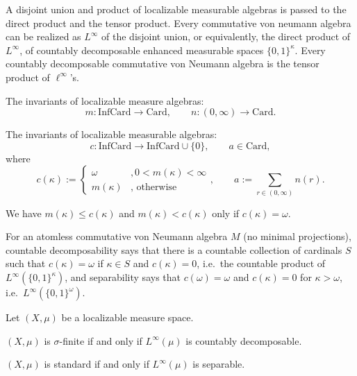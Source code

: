 \documentclass{../../large}
\begin{document}
A disjoint union and product of localizable measurable algebras is passed to the direct product and the tensor product.
Every commutative von neumann algebra can be realized as $L^\infty$ of the disjoint union, or equivalently, the direct product of $L^\infty$, of countably decomposable enhanced measurable spaces $\{0,1\}^\kappa$.
Every countably decomposable commutative von Neumann algebra is the tensor product of $\ell^\infty$'s.

The invariants of localizable measure algebras:
\[m:\mathrm{InfCard}\to\mathrm{Card},\qquad n:(0,\infty)\to\mathrm{Card}.\]

The invariants of localizable measurable algebras:
\[c:\mathrm{InfCard}\to\mathrm{InfCard}\cup\{0\},\qquad a\in\mathrm{Card},\]
where
\[c(\kappa):=\begin{cases}\omega&,0<m(\kappa)<\infty\\m(\kappa)&,\text{ otherwise}\end{cases},\qquad a:=\sum_{r\in(0,\infty)}n(r).\]

We have $m(\kappa)\le c(\kappa)$ and $m(\kappa)<c(\kappa)$ only if $c(\kappa)=\omega$.

For an atomless commutative von Neumann algebra $M$ (no minimal projections), countable decomposability says that there is a countable collection of cardinals $S$ such that $c(\kappa)=\omega$ if $\kappa\in S$ and $c(\kappa)=0$, i.e.~the countable product of $L^\infty(\{0,1\}^\kappa)$, and separability says that $c(\omega)=\omega$ and $c(\kappa)=0$ for $\kappa>\omega$, i.e.~$L^\infty(\{0,1\}^\omega)$.



\begin{prb}
Let $(X,\mu)$ be a localizable measure space.
\begin{parts}
\item $(X,\mu)$ is $\sigma$-finite if and only if $L^\infty(\mu)$ is countably decomposable.
\item $(X,\mu)$ is standard if and only if $L^\infty(\mu)$ is separable.
\end{parts}
\end{prb}


\begin{prb}
\end{prb}
\end{document}
